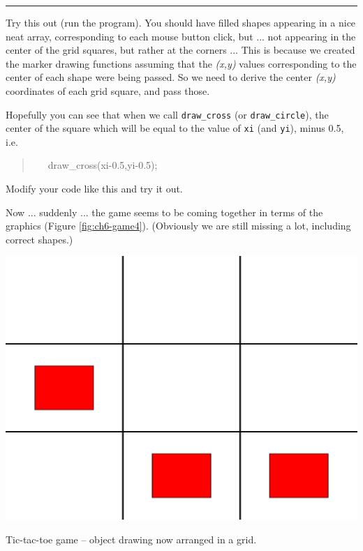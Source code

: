 \documentclass{tufte-book} %
\newenvironment{docspec}{\begin{quotation}\ttfamily\parskip0pt\parindent0pt\ignorespaces}{\end{quotation}}
\begin{document}
\vspace{1mm}
\noindent\rule{4cm}{0.5pt}
\vspace{2mm}

\noindent Try this out (run the program). You should have filled shapes appearing in a nice neat array, corresponding to each mouse button click, but ... not appearing in the center of the grid squares, but rather at the corners ... This is because we created the marker drawing functions assuming that the \textit{(x,y)} values corresponding to the center of each shape were being passed. So we need to derive the center \textit{(x,y)} coordinates of each grid square, and pass those.

Hopefully you can see that when we call \texttt{draw\_cross} (or \texttt{draw\_circle}), the center of the square which will be equal to the  value of \texttt{xi} (and \texttt{yi}), minus 0.5, i.e. 
\vspace{-1mm}\begin{docspec}
\ \ \     draw\_cross(xi-0.5,yi-0.5); 
\end{docspec}\vspace{-1mm}
Modify your code like this and try it out.

Now ... suddenly ... the game seems to be coming together in terms of the graphics (Figure \ref{fig:ch6-game4}). (Obviously we are still missing a lot, including correct shapes.)

\begin{marginfigure}[0.0in]
\includegraphics[width=\linewidth]{ch6-game4.eps}
\caption{Tic-tac-toe game -- object drawing now arranged in a grid.}
\label{fig:ch6-game4}
\end{marginfigure}
\end{document}

